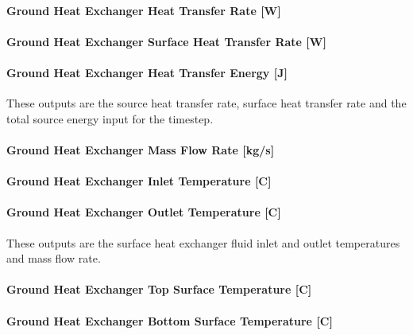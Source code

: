 \paragraph{Ground Heat Exchanger Heat Transfer Rate {[}W{]}}\label{ground-heat-exchanger-heat-transfer-rate-w-2}

\paragraph{Ground Heat Exchanger Surface Heat Transfer Rate {[}W{]}}\label{ground-heat-exchanger-surface-heat-transfer-rate-w}

\paragraph{Ground Heat Exchanger Heat Transfer Energy {[}J{]}}\label{ground-heat-exchanger-heat-transfer-energy-j}

These outputs are the source heat transfer rate, surface heat transfer rate and the total source energy input for the timestep.

\paragraph{Ground Heat Exchanger Mass Flow Rate {[}kg/s{]}}\label{ground-heat-exchanger-mass-flow-rate-kgs-2}

\paragraph{Ground Heat Exchanger Inlet Temperature {[}C{]}}\label{ground-heat-exchanger-inlet-temperature-c-2}

\paragraph{Ground Heat Exchanger Outlet Temperature {[}C{]}}\label{ground-heat-exchanger-outlet-temperature-c-2}

These outputs are the surface heat exchanger fluid inlet and outlet temperatures and mass flow rate.

\paragraph{Ground Heat Exchanger Top Surface Temperature {[}C{]}}\label{ground-heat-exchanger-top-surface-temperature-c}

\paragraph{Ground Heat Exchanger Bottom Surface Temperature {[}C{]}}\label{ground-heat-exchanger-bottom-surface-temperature-c}

